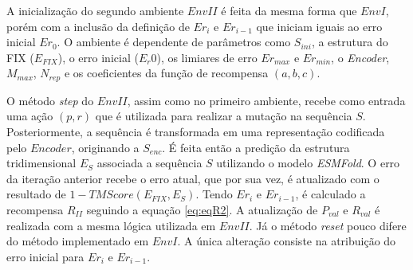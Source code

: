 A inicialização do segundo ambiente $EnvII$ é feita da mesma forma que $EnvI$, porém com a inclusão da definição de $Er_{i}$ e $Er_{i-1}$ que 
iniciam iguais ao erro inicial $Er_{0}$. O ambiente é dependente de parâmetros como $S_{ini}$, a estrutura do FIX 
($E_{FIX}$), o erro inicial ($E_r{0}$), os limiares de erro $Er_{max}$ e $Er_{min}$, o \textit{Encoder},
$M_{max}$, $N_{rep}$ e os coeficientes da função de recompensa $(a, b, c)$.

O método \textit{step} do $EnvII$, assim como no primeiro ambiente, recebe como entrada uma ação $(p, r)$
que é utilizada para realizar a mutação na sequência $S$. 
Posteriormente, a sequência é transformada
em uma representação codificada pelo $Encoder$, originando a $S_{enc}$.
É feita então a predição da estrutura tridimensional $E_S$ associada a sequência $S$ utilizando o modelo \textit{ESMFold}.
O erro da iteração anterior recebe o erro atual, que por sua vez, é atualizado com o resultado de $1-TMScore(E_{FIX}, E_{S})$.
Tendo $Er_{i}$ e $Er_{i-1}$, é calculado a recompensa $R_{II}$ seguindo a equação \ref{eq:eqR2}.
A atualização de $P_{val}$ e $R_{val}$ é realizada com a mesma lógica utilizada em $EnvII$.
Já o método \textit{reset} pouco difere do método implementado em $EnvI$. A única alteração consiste na atribuição do erro inicial 
para $Er_{i}$ e $Er_{i-1}$.



